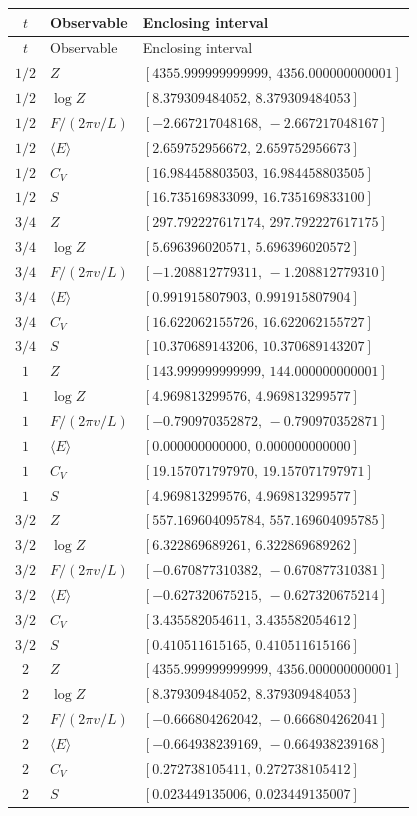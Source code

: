 \begingroup\footnotesize
\setlength{\tabcolsep}{5pt}
\begin{longtable}{@{}cll@{}}
\toprule
$t$ & Observable & Enclosing interval\\
\midrule\endfirsthead
\toprule
$t$ & Observable & Enclosing interval\\
\midrule\endhead
\bottomrule\endfoot
$1/2$ & $Z$ & $[4355.999999999999,\,4356.000000000001]$\\
$1/2$ & $\log Z$ & $[8.379309484052,\,8.379309484053]$\\
$1/2$ & $F/(2\pi v/L)$ & $[-2.667217048168,\,-2.667217048167]$\\
$1/2$ & $\langle E\rangle$ & $[2.659752956672,\,2.659752956673]$\\
$1/2$ & $C_V$ & $[16.984458803503,\,16.984458803505]$\\
$1/2$ & $S$ & $[16.735169833099,\,16.735169833100]$\\
$3/4$ & $Z$ & $[297.792227617174,\,297.792227617175]$\\
$3/4$ & $\log Z$ & $[5.696396020571,\,5.696396020572]$\\
$3/4$ & $F/(2\pi v/L)$ & $[-1.208812779311,\,-1.208812779310]$\\
$3/4$ & $\langle E\rangle$ & $[0.991915807903,\,0.991915807904]$\\
$3/4$ & $C_V$ & $[16.622062155726,\,16.622062155727]$\\
$3/4$ & $S$ & $[10.370689143206,\,10.370689143207]$\\
$1$ & $Z$ & $[143.999999999999,\,144.000000000001]$\\
$1$ & $\log Z$ & $[4.969813299576,\,4.969813299577]$\\
$1$ & $F/(2\pi v/L)$ & $[-0.790970352872,\,-0.790970352871]$\\
$1$ & $\langle E\rangle$ & $[0.000000000000,\,0.000000000000]$\\
$1$ & $C_V$ & $[19.157071797970,\,19.157071797971]$\\
$1$ & $S$ & $[4.969813299576,\,4.969813299577]$\\
$3/2$ & $Z$ & $[557.169604095784,\,557.169604095785]$\\
$3/2$ & $\log Z$ & $[6.322869689261,\,6.322869689262]$\\
$3/2$ & $F/(2\pi v/L)$ & $[-0.670877310382,\,-0.670877310381]$\\
$3/2$ & $\langle E\rangle$ & $[-0.627320675215,\,-0.627320675214]$\\
$3/2$ & $C_V$ & $[3.435582054611,\,3.435582054612]$\\
$3/2$ & $S$ & $[0.410511615165,\,0.410511615166]$\\
$2$ & $Z$ & $[4355.999999999999,\,4356.000000000001]$\\
$2$ & $\log Z$ & $[8.379309484052,\,8.379309484053]$\\
$2$ & $F/(2\pi v/L)$ & $[-0.666804262042,\,-0.666804262041]$\\
$2$ & $\langle E\rangle$ & $[-0.664938239169,\,-0.664938239168]$\\
$2$ & $C_V$ & $[0.272738105411,\,0.272738105412]$\\
$2$ & $S$ & $[0.023449135006,\,0.023449135007]$\\
\end{longtable}
